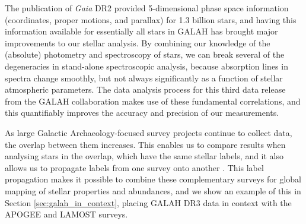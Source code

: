 \documentclass[fleqn,usenatbib,useAMS]{mnras}
\newcommand{\Gaia}{\textit{Gaia}\xspace}
\begin{document}
The publication of \Gaia DR2 \citep{Brown2018, Lindegren2018} provided 5-dimensional phase space information (coordinates, proper motions, and parallax) for 1.3 billion stars, and having this information available for essentially all stars in GALAH has brought major improvements to our stellar analysis. By combining our knowledge of the (absolute) photometry and spectroscopy of stars, we can break several of the degeneracies in stand-alone spectroscopic analysis, because absorption lines in spectra change smoothly, but not always significantly as a function of stellar atmospheric parameters. The data analysis process for this third data release from the GALAH collaboration makes use of these fundamental correlations, and this quantifiably improves the accuracy and precision of our measurements.

As large Galactic Archaeology-focused survey projects continue to collect data, the overlap between them increases. This enables us to compare results when analysing stars in the overlap, which have the same stellar labels, and it also allows us to propagate labels from one survey onto another \citep[see e.g.][]{Casey2017, Ho2017, Xiang2019, Wheeler2020}. This label propagation makes it possible to combine these complementary surveys for global mapping of stellar properties and abundances, and we show an example of this in Section \ref{sec:galah_in_context}, placing GALAH DR3 data in context with the APOGEE and LAMOST surveys.
\end{document}
